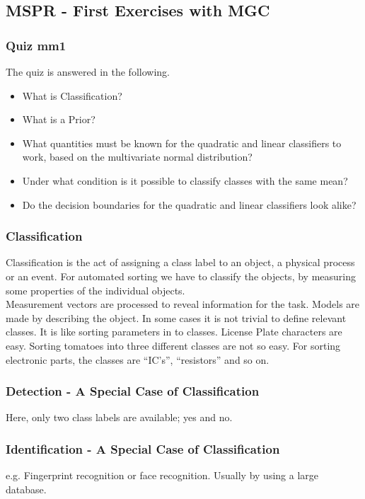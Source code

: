\subsection{MSPR - First Exercises with MGC}
\subsubsection{Quiz mm1}
\label{sub:Quiz_mm1}
The quiz is answered in the following.
\begin{itemize}
    \item What is Classification?
    \item What is a Prior?
    \item What quantities must be known for the quadratic and linear classifiers to work, based on the multivariate normal distribution?
    \item Under what condition is it possible to classify classes with the same mean?
    \item Do the decision boundaries for the quadratic and linear classifiers look alike?
\end{itemize}
%
\subsubsection{Classification}
\label{sec:Classification}
Classification is the act of assigning a class label to an object, a physical process or an event. For automated sorting we have to classify the objects, by measuring some properties of the individual objects.\\ 
Measurement vectors are processed to reveal information for the task. Models are made by describing the object.
In some cases it is not trivial to define relevant classes.
It is like sorting parameters in to classes.
License Plate characters are easy. Sorting tomatoes into three different classes are not so easy.
For sorting electronic parts, the classes are ``IC's'', ``resistors'' and so on. \\
\subsubsection{Detection - A Special Case of Classification}
Here, only two class labels are available; yes and no.
\subsubsection{Identification - A Special Case of Classification}
e.g. Fingerprint recognition or face recognition. 
Usually by using a large database.



